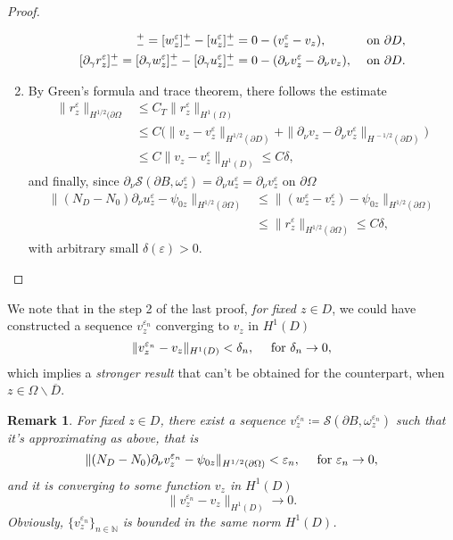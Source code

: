 \documentclass[10pt, a4paper, twoside, openright]{book}
\theoremstyle{definition}
\theoremstyle{plain}
\theoremstyle{plain}
\theoremstyle{plain}
\theoremstyle{plain}
\newtheorem{remark}[subsection]{Remark}
\theoremstyle{plain}
\theoremstyle{plain}
\theoremstyle{plain}
\theoremstyle{plain}
\let\epsilon\varepsilon
\begin{document}
\begin{proof}
\begin{enumerate}
  \begin{align}
   [r^\epsilon_z]^+_- = [w^\epsilon_z]^+_- -[u^\epsilon_z]^+_- &=0 - (v^\epsilon_z - v_z), && \textup{ on }\partial D, \\
   [\partial_\gamma r^\epsilon_z]^+_- = [\partial_\gamma w^\epsilon_z]^+_- -[\partial_\gamma u^\epsilon_z]^+_-&= 0 - (\partial_\nu v^\epsilon_z - \partial_\nu v_z), && \textup{ on }\partial D.
  \end{align}
  \item By Green's formula and trace theorem, there follows the estimate
  \begin{align}
   \|r^\epsilon_z\|_{H^{1/2}(\partial \Omega} & \leq C_T\|r^\epsilon_z\|_{H^1(\Omega)} \\
   & \leq C\bigl(\|v_z - v^\epsilon_z\|_{H^{1/2}(\partial D)} + \|\partial_\nu v_z - \partial_\nu v^\epsilon_z\|_{H^{\, -1/2}(\partial D)}\bigr) \\
   & \leq C \|v_z - v^\epsilon_z\|_{H^1(D)}\leq C\delta,
  \end{align}
  and finally, since $\partial_\nu\mathcal{S}(\partial B, \omega^\epsilon_z) = \partial_\nu u^\epsilon_z = \partial_\nu v^\epsilon_z$ on $\partial \Omega$
  \begin{align}
   \|({N_D} - {N_0})\partial_\nu u^\epsilon_z - \psi_{0z}\|_{H^{1/2}(\partial\Omega)} &\leq \|(w^\epsilon_z- v^\epsilon_z) - \psi_{0z}\|_{H^{1/2}(\partial\Omega)} \\
   &\leq\|r^\epsilon_z\|_{H^{1/2}(\partial \Omega)}\leq C\delta,
  \end{align}
  with arbitrary small $\delta(\epsilon)>0$.
  \qedhere
 \end{enumerate}
\end{proof}
We note that in the step 2 of the last proof, \emph{for fixed $z \in D$}, we could have constructed a sequence $v^{\epsilon_n}_z$ converging to $v_z$ in $H^1(D)$
\begin{equation}
 \|v^{\epsilon_n}_z - v_z\|_{H^1(D)} < \delta_n, \quad \textup{ for }\delta_n \to 0,
\end{equation}
which implies a \emph{stronger result} that can't be obtained for the counterpart, when $z\in\Omega\backslash\overline{D}$.
\begin{remark}
 For fixed $z\in D$, there exist a sequence 
 $v^{\epsilon_n}_z\coloneqq\mathcal{S}(\partial B, \omega^{\epsilon_n}_z)$ 
 such that it's approximating as above, that is
\begin{equation}
 \|({N_D} - {N_0})\partial_\nu v^{\epsilon_n}_z - \psi_{0z}\|_{H^{1/2}(\partial\Omega)} < \epsilon_n, \quad \textup{ for }\epsilon_n\to 0,
\end{equation}
 and it is converging to some function $v_z$ in $H^1(D)$
\begin{equation}
 \|v^{\epsilon_n}_z - v_z\|_{H^1(D)} \to 0.
\end{equation}
 Obviously, $\{v^{\epsilon_n}_z\}_{n\in\mathbb{N}}$ is bounded in the same norm $H^1(D)$.
\end{remark}
\end{document}
